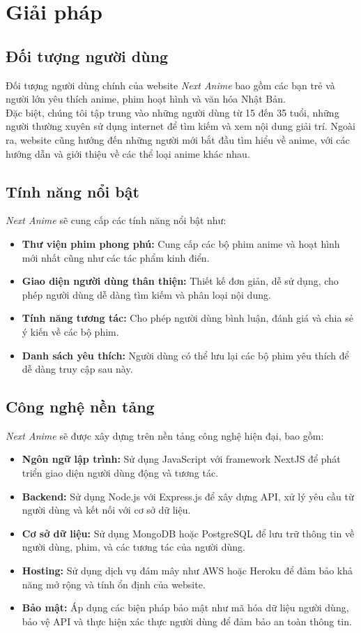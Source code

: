 \section{Giải pháp}

\subsection{Đối tượng người dùng}
\headindent Đối tượng người dùng chính của website \textit{Next Anime} bao gồm các bạn trẻ và người lớn yêu thích anime, phim hoạt hình và văn hóa Nhật Bản. 
\\
\headindent Đặc biệt, chúng tôi tập trung vào những người dùng từ 15 đến 35 tuổi, những người thường xuyên sử dụng internet để tìm kiếm và xem nội dung giải trí. Ngoài ra, website cũng hướng đến những người mới bắt đầu tìm hiểu về anime, với các hướng dẫn và giới thiệu về các thể loại anime khác nhau.

\subsection{Tính năng nổi bật}
\textit{Next Anime} sẽ cung cấp các tính năng nổi bật như:
\begin{itemize}
\item \textbf{Thư viện phim phong phú:} Cung cấp các bộ phim anime và hoạt hình mới nhất cũng như các tác phẩm kinh điển.
\item \textbf{Giao diện người dùng thân thiện:} Thiết kế đơn giản, dễ sử dụng, cho phép người dùng dễ dàng tìm kiếm và phân loại nội dung.
\item \textbf{Tính năng tương tác:} Cho phép người dùng bình luận, đánh giá và chia sẻ ý kiến về các bộ phim.
\item \textbf{Danh sách yêu thích:} Người dùng có thể lưu lại các bộ phim yêu thích để dễ dàng truy cập sau này.

\end{itemize}
\subsection{Công nghệ nền tảng}
\textit{Next Anime} sẽ được xây dựng trên nền tảng công nghệ hiện đại, bao gồm:
\begin{itemize}
    \item \textbf{Ngôn ngữ lập trình:} Sử dụng JavaScript với framework NextJS để phát triển giao diện người dùng động và tương tác.
    \item \textbf{Backend:} Sử dụng Node.js với Express.js để xây dựng API, xử lý yêu cầu từ người dùng và kết nối với cơ sở dữ liệu.
    \item \textbf{Cơ sở dữ liệu:} Sử dụng MongoDB hoặc PostgreSQL để lưu trữ thông tin về người dùng, phim, và các tương tác của người dùng.
    \item \textbf{Hosting:} Sử dụng dịch vụ đám mây như AWS hoặc Heroku để đảm bảo khả năng mở rộng và tính ổn định của website.
    \item \textbf{Bảo mật:} Áp dụng các biện pháp bảo mật như mã hóa dữ liệu người dùng, bảo vệ API và thực hiện xác thực người dùng để đảm bảo an toàn thông tin.
\end{itemize}
